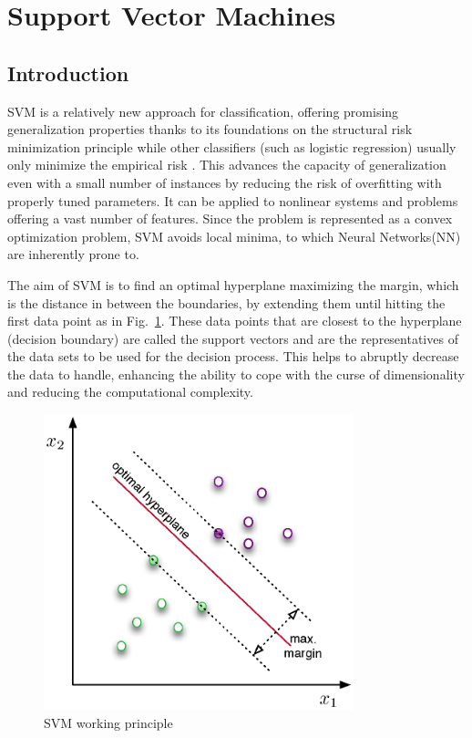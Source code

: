 \section{Support Vector Machines}

\subsection{Introduction}

SVM is a relatively new approach for classification, offering promising generalization properties thanks to its foundations on the structural risk minimization principle while other classifiers (such as logistic regression) usually only minimize the empirical risk \cite{gunn1998support,yin2014study}. 
This advances the capacity of generalization even with a small number of instances by reducing the risk of overfitting with properly tuned parameters. 
It can be applied to nonlinear systems and problems offering a vast number of features. 
Since the problem is represented as a convex optimization problem, SVM avoids local minima, to which Neural Networks(NN) are inherently prone to.

The aim of SVM is to find an optimal hyperplane maximizing the margin, which is the distance in between the boundaries, by extending them until hitting the first data point as in Fig.~\ref{fig:svmHyperplane}. These data points that are closest to the hyperplane (decision boundary) are called the support vectors and are the representatives of the data sets to be used for the decision process. This helps to abruptly decrease the data to handle, enhancing the ability to cope with the curse of dimensionality and reducing the computational complexity.

\begin{figure}
\begin{center}
\includegraphics[width=9cm]{figures/svmHyperplane}    %
\caption{SVM working principle} 
\label{fig:svmHyperplane}
\end{center}
\end{figure}

